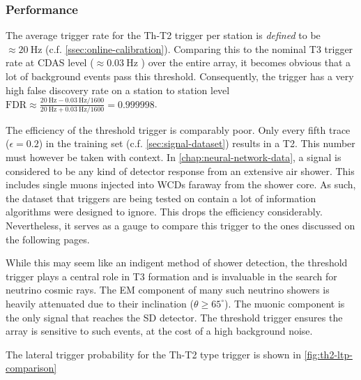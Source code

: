 \subsubsection{Performance}
\label{ssec:th-performance}

The average trigger rate for the Th-T2 trigger per station is \textit{defined} to be $\approx\SI{20}{\hertz}$ (c.f. \autoref{ssec:online-calibration}). Comparing 
this to the nominal T3 trigger rate at CDAS level ($\approx\SI{0.03}{\hertz}$ \cite{abraham2010trigger}) over the entire array, it becomes obvious that a lot of 
background events pass this threshold. Consequently, the trigger has a very high false discovery rate on a station to station level
$\text{FDR}\approx\frac{\SI{20}{\hertz} - \SI{0.03}{\hertz}/1600}{\SI{20}{\hertz} + \SI{0.03}{\hertz}/1600}=0.999998$.

The efficiency of the threshold trigger is comparably poor. Only every fifth trace ($\epsilon = 0.2$) in the training set (c.f. \autoref{sec:signal-dataset}) 
results in a T2. This number must however be taken with context. In \autoref{chap:neural-network-data}, a signal is considered to be any kind of detector response 
from an extensive air shower. This includes single muons injected into WCDs faraway from the shower core. As such, the dataset that triggers are being tested on 
contain a lot of information algorithms were designed to ignore. This drops the efficiency considerably. Nevertheless, it serves as a gauge to compare this trigger
to the ones discussed on the following pages.

While this may seem like an indigent method of shower detection, the threshold trigger plays a central role in T3 formation and is invaluable in the search for 
neutrino cosmic rays. The EM component of many such neutrino showers is heavily attenuated due to their inclination ($\theta \geq 65^\circ$). The muonic component
is the only signal that reaches the SD detector. The threshold trigger ensures the array is sensitive to such events, at the cost of a high background noise. 

The lateral trigger probability for the Th-T2 type trigger is shown in \autoref{fig:th2-ltp-comparison}

